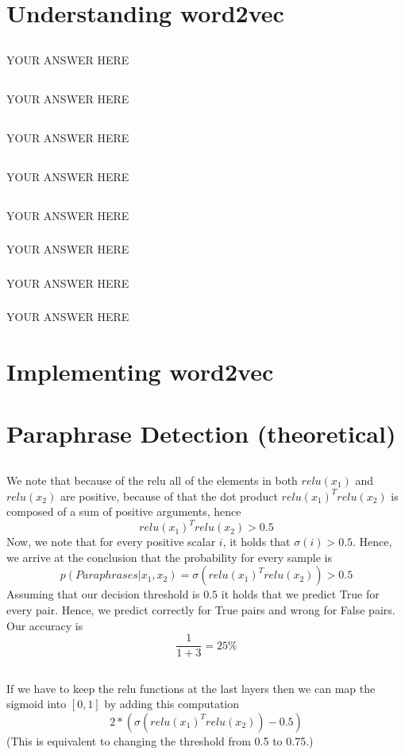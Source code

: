 \documentclass{article}
\begin{document}
\section{Understanding word2vec}
\subsection{}
YOUR ANSWER HERE
\subsection{}
YOUR ANSWER HERE
\subsection{}
YOUR ANSWER HERE
\subsection{}
YOUR ANSWER HERE
\subsection{}
YOUR ANSWER HERE
\subsubsection{}
YOUR ANSWER HERE
\subsubsection{}
YOUR ANSWER HERE
\subsubsection{}
YOUR ANSWER HERE
\section{Implementing word2vec}
\setcounter{subsection}{4}
\subsection{}


\section{Paraphrase Detection (theoretical)}
\subsection{}
We note that because of the relu all of the elements in both $relu(x_1)$ and $relu(x_2)$ are positive, 
because of that the dot product $relu(x_1)^T relu(x_2)$ is composed of a sum of positive arguments, hence 
$$relu(x_1)^T relu(x_2) > 0.5$$
Now, we note that for every positive scalar $i$, it holds that $\sigma (i) > 0.5$. Hence, we arrive at the conclusion that the probability for every sample is
$$p(Paraphrases|x_1, x_2) = \sigma (relu(x_1)^T relu(x_2)) > 0.5$$
Assuming that our decision threshold is $0.5$ it holds that we predict True for every pair.
Hence, we predict correctly for True pairs and wrong for False pairs. Our accuracy is 
$$\frac{1}{1+3}=25 \% $$
\subsection{}
If we have to keep the relu functions at the last layers then we can map the sigmoid into $[0,1]$ by adding this computation
$$2*(\sigma (relu(x_1)^T relu(x_2)) - 0.5)$$
(This is equivalent to changing the threshold from 0.5 to 0.75.)
\end{document}
